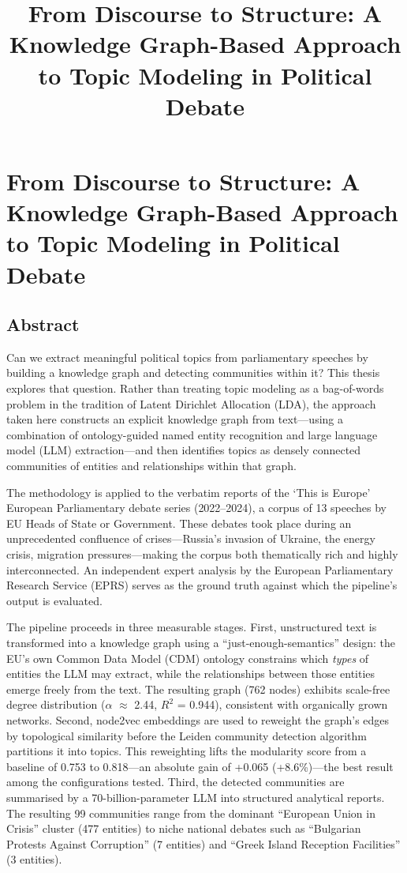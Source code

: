 \documentclass[11pt]{article}
\title{From Discourse to Structure: A Knowledge Graph-Based Approach to Topic Modeling in Political Debate}
\author{}
\date{}
\begin{document}
\maketitle


\section{From Discourse to Structure: A Knowledge Graph-Based Approach to Topic Modeling in Political Debate}


\subsection{Abstract}


Can we extract meaningful political topics from parliamentary speeches by building a knowledge graph and detecting communities within it? This thesis explores that question. Rather than treating topic modeling as a bag-of-words problem in the tradition of Latent Dirichlet Allocation (LDA), the approach taken here constructs an explicit knowledge graph from text---using a combination of ontology-guided named entity recognition and large language model (LLM) extraction---and then identifies topics as densely connected communities of entities and relationships within that graph.

The methodology is applied to the verbatim reports of the `This is Europe' European Parliamentary debate series (2022--2024), a corpus of 13 speeches by EU Heads of State or Government. These debates took place during an unprecedented confluence of crises---Russia's invasion of Ukraine, the energy crisis, migration pressures---making the corpus both thematically rich and highly interconnected. An independent expert analysis by the European Parliamentary Research Service (EPRS) serves as the ground truth against which the pipeline's output is evaluated.

The pipeline proceeds in three measurable stages. First, unstructured text is transformed into a knowledge graph using a ``just-enough-semantics'' design: the EU's own Common Data Model (CDM) ontology constrains which \emph{types} of entities the LLM may extract, while the relationships between those entities emerge freely from the text. The resulting graph (762 nodes) exhibits scale-free degree distribution ($\alpha$ $\approx$ 2.44, $R^2$ = 0.944), consistent with organically grown networks. Second, node2vec embeddings are used to reweight the graph's edges by topological similarity before the Leiden community detection algorithm partitions it into topics. This reweighting lifts the modularity score from a baseline of 0.753 to 0.818---an absolute gain of +0.065 (+8.6\%)---the best result among the configurations tested. Third, the detected communities are summarised by a 70-billion-parameter LLM into structured analytical reports. The resulting 99 communities range from the dominant ``European Union in Crisis'' cluster (477 entities) to niche national debates such as ``Bulgarian Protests Against Corruption'' (7 entities) and ``Greek Island Reception Facilities'' (3 entities).
\end{document}
